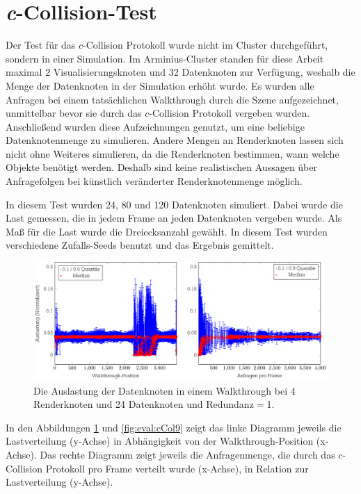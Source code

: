 \section{\textit{c}-Collision-Test}
\label{sec:eval:ccollision}

Der Test für das $c$-Collision Protokoll wurde nicht im Cluster durchgeführt, sondern in einer Simulation. Im Arminius-Cluster standen für diese Arbeit maximal 2 Visualisierungsknoten und 32 Datenknoten zur Verfügung, weshalb die Menge der Datenknoten in der Simulation erhöht wurde. Es wurden alle Anfragen bei einem tatsächlichen Walkthrough durch die Szene aufgezeichnet, unmittelbar bevor sie durch das $c$-Collision Protokoll vergeben wurden. Anschließend wurden diese Aufzeichnungen genutzt, um eine beliebige Datenknotenmenge zu simulieren. Andere Mengen an Renderknoten lassen sich nicht ohne Weiteres simulieren, da die Renderknoten bestimmen, wann welche Objekte benötigt werden. Deshalb sind keine realistischen Aussagen über Anfragefolgen bei künstlich veränderter Renderknotenmenge möglich.


In diesem Test wurden 24, 80 und 120 Datenknoten simuliert. Dabei wurde die Last gemessen, die in jedem Frame an jeden Datenknoten vergeben wurde. Als Maß für die Last wurde die Dreiecksanzahl gewählt. In diesem Test wurden verschiedene Zufalls-Seeds benutzt und das Ergebnis gemittelt.
\begin{figure}
\centering
\includegraphics[width=\hsize]{images/diag_cCol_red1_render4_data24_2x.pdf}
  \caption{\label{fig:eval:cCol1}Die Auslastung der Datenknoten in einem Walkthrough bei 4 Renderknoten und 24 Datenknoten und Redundanz$=$1.}
\end{figure}

In den Abbildungen \ref{fig:eval:cCol1} und \ref{fig:eval:cCol9} zeigt das linke Diagramm jeweils die Lastverteilung (y-Achse) in Abhängigkeit von der Walkthrough-Position (x-Achse). Das rechte Diagramm zeigt jeweils die Anfragenmenge, die durch das $c$-Collision Protokoll pro Frame verteilt wurde (x-Achse), in Relation zur Lastverteilung (y-Achse). 

